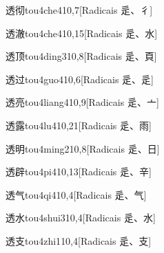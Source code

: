 \begin{entry}{透彻}{tou4che4}{10,7}[Radicais ⾡、⼻]
\end{entry}

\begin{entry}{透澈}{tou4che4}{10,15}[Radicais ⾡、⽔]
\end{entry}

\begin{entry}{透顶}{tou4ding3}{10,8}[Radicais ⾡、⾴]
\end{entry}

\begin{entry}{透过}{tou4guo4}{10,6}[Radicais ⾡、⾡]
\end{entry}

\begin{entry}{透亮}{tou4liang4}{10,9}[Radicais ⾡、⼇]
\end{entry}

\begin{entry}{透露}{tou4lu4}{10,21}[Radicais ⾡、⾬]
\end{entry}

\begin{entry}{透明}{tou4ming2}{10,8}[Radicais ⾡、⽇]
\end{entry}

\begin{entry}{透辟}{tou4pi4}{10,13}[Radicais ⾡、⾟]
\end{entry}

\begin{entry}{透气}{tou4qi4}{10,4}[Radicais ⾡、⽓]
\end{entry}

\begin{entry}{透水}{tou4shui3}{10,4}[Radicais ⾡、⽔]
\end{entry}

\begin{entry}{透支}{tou4zhi1}{10,4}[Radicais ⾡、⽀]
\end{entry}

